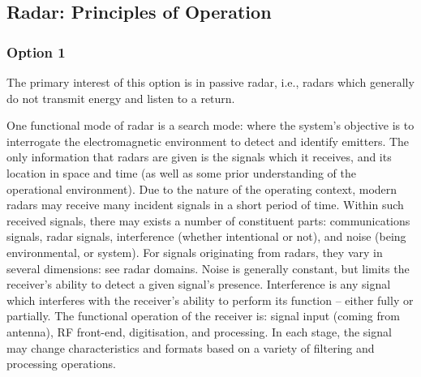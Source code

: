 

\subsection{Radar: Principles of Operation}

\subsubsection{Option 1}

The primary interest of this option is in passive radar, i.e., radars which generally do not transmit energy and listen to a return.

One functional mode of radar is a search mode: where the system’s objective is to interrogate the electromagnetic environment to detect and identify emitters. The only information that radars are given is the signals which it receives, and its location in space and time (as well as some prior understanding of the operational environment). Due to the nature of the operating context, modern radars may receive many incident signals in a short period of time. Within such received signals, there may exists a number of constituent parts: communications signals, radar signals, interference (whether intentional or not), and noise (being environmental, or system). For signals originating from radars, they vary in several dimensions: see radar domains. Noise is generally constant, but limits the receiver’s ability to detect a given signal’s presence. Interference is any signal which interferes with the receiver’s ability to perform its function – either fully or partially. The functional operation of the receiver is: signal input (coming from antenna), RF front-end, digitisation, and processing. In each stage, the signal may change characteristics and formats based on a variety of filtering and processing operations.

